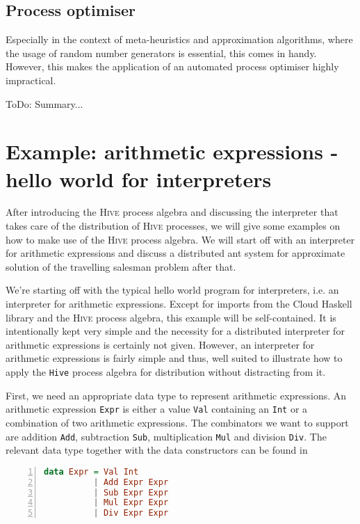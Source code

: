 \subsection{Process optimiser}

Especially in the context of meta-heuristics and approximation algorithms, where the usage of random number generators is essential, this comes in handy. However, this makes the application of an automated process optimiser highly impractical.

ToDo: Summary...

\section{Example: arithmetic expressions - hello world for interpreters}
\label{chp:example}
After introducing the \textsc{Hive} process algebra and discussing the interpreter that takes care of the distribution of \textsc{Hive} processes, we will give some examples on how to make use of the \textsc{Hive} process algebra. We will start off with an interpreter for arithmetic expressions and discuss a distributed ant system for approximate solution of the travelling salesman problem after that.

We're starting off with the typical hello world program for interpreters, i.e. an interpreter for arithmetic expressions. Except for imports from the \textsf{Cloud Haskell} library and the \textsc{Hive} process algebra, this example will be self-contained. It is intentionally kept very simple and the necessity for a distributed interpreter for arithmetic expressions is certainly not given. However, an interpreter for arithmetic expressions is fairly simple and thus, well suited to illustrate how to apply the \texttt{Hive} process algebra for distribution without distracting from it.

First, we need an appropriate data type to represent arithmetic expressions. An arithmetic expression \texttt{Expr} is either a value \texttt{Val} containing an \texttt{Int} or a combination of two arithmetic expressions. The combinators we want to support are addition \texttt{Add}, subtraction \texttt{Sub}, multiplication \texttt{Mul} and division \texttt{Div}. The relevant data type together with the data constructors can be found in  
\begin{lstlisting}[language=Haskell, caption=Data model for the representation of arithmetic expressions., label=lst:arith_model, numbers=left, frame=bt]
data Expr = Val Int
          | Add Expr Expr
          | Sub Expr Expr
          | Mul Expr Expr
          | Div Expr Expr
\end{lstlisting}

